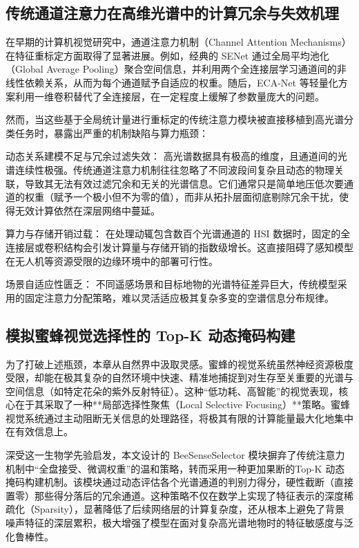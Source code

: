 \subsection{传统通道注意力在高维光谱中的计算冗余与失效机理}
在早期的计算机视觉研究中，通道注意力机制（Channel Attention Mechanisms）在特征重标定方面取得了显著进展。例如，经典的 SENet 通过全局平均池化（Global Average Pooling）聚合空间信息，并利用两个全连接层学习通道间的非线性依赖关系，从而为每个通道赋予自适应的权重。随后，ECA-Net 等轻量化方案利用一维卷积替代了全连接层，在一定程度上缓解了参数量庞大的问题。

然而，当这些基于全局统计量进行重标定的传统注意力模块被直接移植到高光谱分类任务时，暴露出严重的机制缺陷与算力瓶颈：

动态关系建模不足与冗余过滤失效： 高光谱数据具有极高的维度，且通道间的光谱连续性极强。传统通道注意力机制往往忽略了不同波段间复杂且动态的物理关联，导致其无法有效过滤冗余和无关的光谱信息。它们通常只是简单地压低次要通道的权重（赋予一个极小但不为零的值），而非从拓扑层面彻底剔除冗余干扰，使得无效计算依然在深层网络中蔓延。

算力与存储开销过载： 在处理动辄包含数百个光谱通道的 HSI 数据时，固定的全连接层或卷积结构会引发计算量与存储开销的指数级增长。这直接阻碍了感知模型在无人机等资源受限的边缘环境中的部署可行性。

场景自适应性匮乏： 不同遥感场景和目标地物的光谱特征差异巨大，传统模型采用的固定注意力分配策略，难以灵活适应极其复杂多变的空谱信息分布规律。

\subsection{模拟蜜蜂视觉选择性的 Top-K 动态掩码构建}
为了打破上述瓶颈，本章从自然界中汲取灵感。蜜蜂的视觉系统虽然神经资源极度受限，却能在极其复杂的自然环境中快速、精准地捕捉到对生存至关重要的光谱与空间信息（如特定花朵的紫外反射特征）。这种“低功耗、高智能”的视觉表现，核心在于其采取了一种**局部选择性聚焦（Local Selective Focusing）**策略。蜜蜂视觉系统通过主动阻断无关信息的处理路径，将极其有限的计算能量最大化地集中在有效信息上。

深受这一生物学先验启发，本文设计的 BeeSenseSelector 模块摒弃了传统注意力机制中“全盘接受、微调权重”的温和策略，转而采用一种更加果断的Top-K 动态掩码构建机制。该模块通过动态评估各个光谱通道的判别力得分，硬性截断（直接置零）那些得分落后的冗余通道。这种策略不仅在数学上实现了特征表示的深度稀疏化（Sparsity），显著降低了后续网络层的计算复杂度，还从根本上避免了背景噪声特征的深层累积，极大增强了模型在面对复杂高光谱地物时的特征敏感度与泛化鲁棒性。

